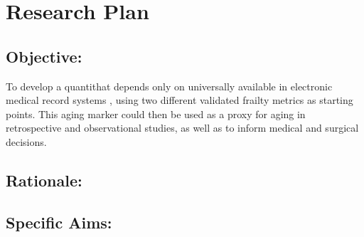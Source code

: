 \section{Research Plan }\label{research-plan}


\subsection{Objective:}\label{objective}
  
To develop a quantithat depends only on universally available in electronic medical record systems ,
using two different validated frailty metrics as starting points. This
aging marker could then be used as a proxy for aging in retrospective
and observational studies, as well as to inform medical and surgical
decisions.


\subsection{Rationale:}\label{rationale}

\subsection{Specific Aims:}\label{specific-aims}
